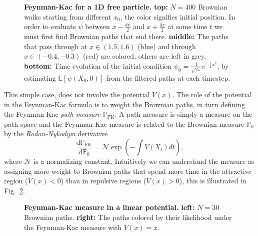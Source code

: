 \begin{figure}[H]
	\caption[Feynman-Kac for a 1D free particle]{\textbf{Feynman-Kac for a 1D free particle.} \textbf{top:} $N=400$ Brownian walks starting from different $x_0$, the color signifies initial position. In order to evaluate $\psi$ between $x-\frac{\delta x}{2}$ and $x+\frac{\delta x}{2}$ at some time $t$ we must first find Brownian paths that end there. \textbf{middle:} The paths that pass through at $x \in (1.5, 1.6)$ (blue) and through $x \in (-0.4,-0.3)$ (red) are colored, others are left in grey. \textbf{bottom:} Time evolution of the initial condition $\psi_{0} = \frac{1}{\sqrt{2 \pi}} e^{-\frac{1}{2} x^{2}}$, by estimating ${\mathbb{E}}\left[\psi\left(X_{0}, 0\right)\right]$ from the filtered paths at each timestep.}
	\label{fig:fk_1d_example}
\end{figure}
This simple case, does not involve the potential $V(x)$. The role of the potential in the Feynman-Kac formula is to weight the Brownian paths, in turn defining the Feynman-Kac \emph{path measure} $\mathbb{P}_{\mathrm{FK}}$. A path measure is simply a measure on the path space and the Feynman-Kac measure is related to the Brownian measure $\mathbb{P}_{0}$ by the \emph{Radon-Nykodym} derivative
\begin{equation}
	\frac{\mathrm{d} \mathbb{P}_{\mathrm{FK}}}{\mathrm{d} \mathbb{P}_{0}}=\mathcal{N} \exp \left(-\int V\left(X_{t}\right) d t\right),
\end{equation}
where $\mathcal{N}$ is a normalizing constant. Intuitively we can understand the measure as assigning more weight to Brownian paths that spend more time in the attractive region ($V(x) < 0$) than in repulsive regions ($V(x) > 0$), this is illustrated in Fig.~\ref{fig:fkac_measure_reweight}.
\begin{figure}[H]
	\centering
	\caption[Feynman-Kac measure in a linear potential]{\textbf{Feynman-Kac measure in a linear potential.} 
	\textbf{left:} $N=30$ Brownian paths. \textbf{right:} The paths colored by their likelihood under the Feynman-Kac measure with $V(x)=x$. }
	\label{fig:fkac_measure_reweight}
\end{figure}
